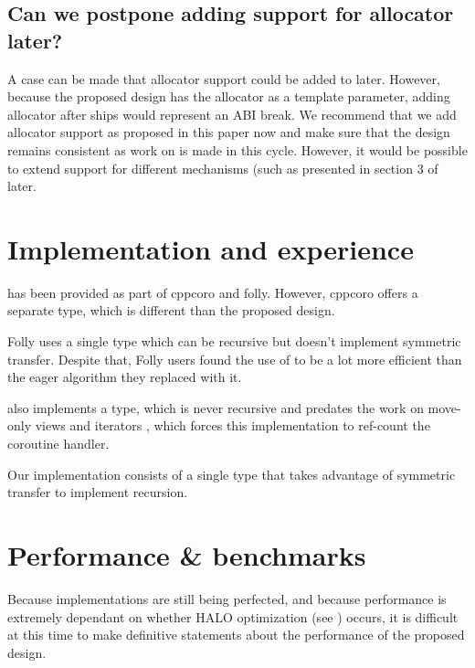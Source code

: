 \documentclass{wg21}
\begin{document}
\subsection{Can we postpone adding support for allocator later?}

A case can be made that allocator support could be added to  later.
However, because the proposed design has the allocator as a template parameter,
adding allocator after  ships would represent an ABI break.
We recommend that we add allocator support as proposed in this paper now and make sure that the design remains consistent as work on 
is made in this cycle.
However, it would be possible to extend support for different mechanisms (such as presented in section 3 of  later.

\section{Implementation and experience}

 has been provided as part of cppcoro and folly.
However, cppcoro offers a separate  type, which is different than the proposed design.

Folly uses a single  type which can be recursive but doesn't implement symmetric transfer. Despite that,
Folly users found the use of  to be a lot more efficient than the eager algorithm they replaced with it.

 also implements a  type, which is never recursive and predates the work on move-only views and
iterators \cite{P1456R1}, \cite{P1207R0} which forces this implementation to ref-count the coroutine handler.

Our implementation \cite{Implementation} consists of a single type that takes advantage of symmetric transfer to implement
recursion.

\section{Performance \& benchmarks}

Because implementations are still being perfected, and because performance is extremely dependant on whether HALO optimization (see )
occurs, it is difficult at this time to make definitive statements about the performance of the proposed design.
\end{document}
